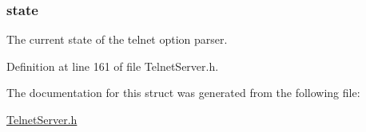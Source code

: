 \hypertarget{struct_telnet_server__t_a8010cffb8a33a3f5d540dcd6ef57a7b6}{
\subsubsection[{state}]{ state}}\label{struct_telnet_server__t_a8010cffb8a33a3f5d540dcd6ef57a7b6}
The current state of the telnet option parser. 

Definition at line 161 of file Telnet\-Server.\-h.



The documentation for this struct was generated from the following file\-:\begin{DoxyCompactItemize}
\item 
\hyperlink{_telnet_server_8h}{Telnet\-Server.\-h}\end{DoxyCompactItemize}
